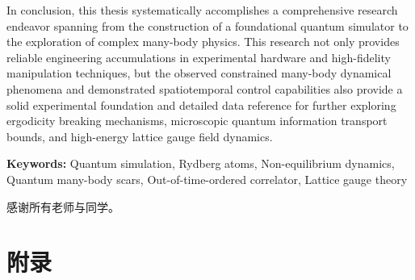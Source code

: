 \documentclass[type=doctor, anonymous=true]{hustthesis}
\begin{document}
\begin{abstract*}
In conclusion, this thesis systematically accomplishes a comprehensive research endeavor spanning from the construction of a foundational quantum simulator to the exploration of complex many-body physics. This research not only provides reliable engineering accumulations in experimental hardware and high-fidelity manipulation techniques, but the observed constrained many-body dynamical phenomena and demonstrated spatiotemporal control capabilities also provide a solid experimental foundation and detailed data reference for further exploring ergodicity breaking mechanisms, microscopic quantum information transport bounds, and high-energy lattice gauge field dynamics.

\textbf{Keywords:} Quantum simulation, Rydberg atoms, Non-equilibrium dynamics, Quantum many-body scars, Out-of-time-ordered correlator, Lattice gauge theory
\end{abstract*}

\tableofcontents

\cleardoublepage
\listoffigures

\cleardoublepage
\listoftables

\mainmatter










\backmatter

\begin{acknowledgements} 
  感谢所有老师与同学。
\end{acknowledgements}

\printbibliography

\appendix

\chapter{附录}
\end{document}
